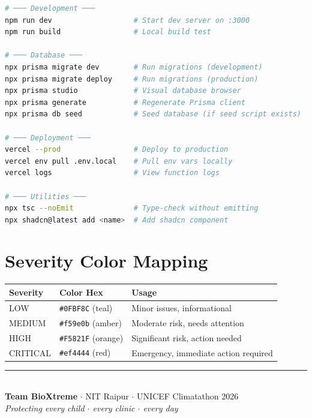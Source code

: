 \documentclass[12pt,a4paper]{report}
\begin{document}
\begin{lstlisting}[language=bash]
# ─── Development ───
npm run dev                   # Start dev server on :3000
npm run build                 # Local build test

# ─── Database ───
npx prisma migrate dev        # Run migrations (development)
npx prisma migrate deploy     # Run migrations (production)
npx prisma studio             # Visual database browser
npx prisma generate           # Regenerate Prisma client
npx prisma db seed            # Seed database (if seed script exists)

# ─── Deployment ───
vercel --prod                 # Deploy to production
vercel env pull .env.local    # Pull env vars locally
vercel logs                   # View function logs

# ─── Utilities ───
npx tsc --noEmit              # Type-check without emitting
npx shadcn@latest add <name>  # Add shadcn component
\end{lstlisting}

\section{Severity Color Mapping}

\begin{tabularx}{\textwidth}{llX}
\toprule
\textbf{Severity} & \textbf{Color Hex} & \textbf{Usage} \\
\midrule
LOW      & \texttt{\#0FBF8C} (teal)   & Minor issues, informational \\
MEDIUM   & \texttt{\#f59e0b} (amber)  & Moderate risk, needs attention \\
HIGH     & \texttt{\#F5821F} (orange) & Significant risk, action needed \\
CRITICAL & \texttt{\#ef4444} (red)    & Emergency, immediate action required \\
\bottomrule
\end{tabularx}

\vfill
\begin{center}
\textcolor{teal}{\rule{0.5\textwidth}{0.5pt}}\\
\vspace{0.5cm}
{\large\textbf{Team BioXtreme}} $\cdot$ NIT Raipur $\cdot$ UNICEF Climatathon 2026\\
\textit{Protecting every child $\cdot$ every clinic $\cdot$ every day}
\end{center}
\end{document}
